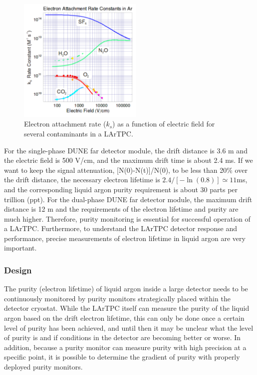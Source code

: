 \begin{figure}[h]
\centering
\includegraphics[height=6cm]{../figures/PrMon_ks.pdf}
\caption{Electron attachment rate ($k_s$) as a function of electric field for several contaminants in a LArTPC.}\label{fig:ks}
\end{figure}


For the single-phase DUNE far detector module, the drift distance is 3.6 m and the electric field is 500 V/cm, and the maximum drift time is about 2.4 ms. If we want to keep the signal attenuation, [N(0)-N(t)]/N(0), to be less than  20\% over the drift distance, the necessary electron lifetime is $2.4/[-\ln(0.8)] \simeq 11 $ms, and the corresponding liquid argon purity requirement is about 30 parts per trillion (ppt). For the dual-phase DUNE far detector module, the maximum drift distance is 12 m and the requirements of the electron lifetime and purity are much higher. Therefore, purity monitoring is essential for successful operation of a LArTPC. Furthermore, to understand the LArTPC detector response and performance, precise measurements of electron lifetime in liquid argon are very important.

\subsubsection{Design}



The purity (electron lifetime) of liquid argon inside a large detector needs to be continuously monitored by purity monitors strategically placed within the detector cryostat. While the LArTPC itself can measure the purity of the liquid argon based on the drift electron lifetime, this can only be done once a certain level of purity has been achieved, and until then it may be unclear what the level of purity is and if conditions in the detector are becoming better or worse. In addition, because a purity monitor can measure purity with high precision at a specific point, it is possible to determine the gradient of purity with properly deployed purity monitors.


